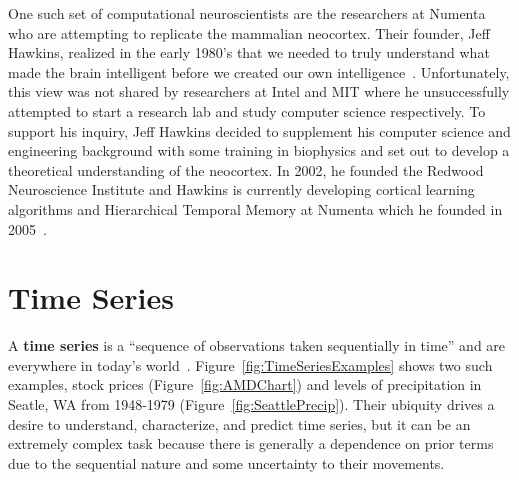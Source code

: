 \documentclass[oneside,12pt,openany]{book}
\begin{document}
	One such set of computational neuroscientists are the researchers at Numenta who are attempting to replicate the mammalian neocortex. Their founder, Jeff Hawkins, realized in the early 1980's that we needed to truly understand what made the brain intelligent before we created our own intelligence~\cite{OnIntelligence}. Unfortunately, this view was not shared by  researchers at Intel and MIT where he unsuccessfully attempted to start a research lab and study computer science respectively. To support his inquiry, Jeff Hawkins decided to supplement his computer science and engineering background with some training in biophysics and set out to develop a theoretical understanding of the neocortex. In 2002, he founded the Redwood Neuroscience Institute and Hawkins is currently developing cortical learning algorithms and Hierarchical Temporal Memory at Numenta which he founded in 2005~\cite{OnIntelligence}. 
	
	\chapter{Time Series}
	
	A \textbf{time series} is a ``sequence of observations taken sequentially in time'' and are everywhere in today's world~\cite{Box}. Figure~\ref{fig:TimeSeriesExamples} shows two such examples, stock prices (Figure~\ref{fig:AMDChart}) and levels of precipitation in Seatle, WA from 1948-1979 (Figure~\ref{fig:SeattlePrecip}). Their ubiquity drives a desire to understand, characterize, and predict time series, but it can be an extremely complex task because there is generally a dependence on prior terms due to the sequential nature and some uncertainty to their movements.
	
\end{document}
